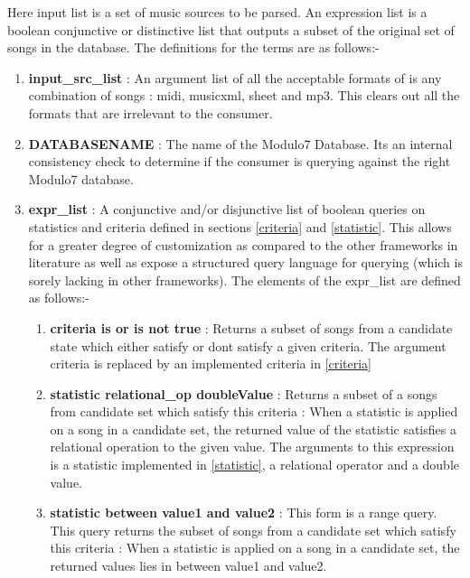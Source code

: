 \noindent Here input list is a set of music sources to be parsed. An expression list is a boolean conjunctive or distinctive list that outputs a subset of the original set of songs in the database. The definitions for the terms are as follows:-

\begin{enumerate}
\item \textbf{input\_src\_list} : An argument list of all the acceptable formats of is any combination of songs : midi, musicxml, sheet and mp3. This clears out all the formats that are irrelevant to the consumer. 

\item \textbf{DATABASENAME} : The name of the Modulo7 Database. Its an internal consistency check to determine if the consumer is querying against the right Modulo7 database. 

\item \textbf{expr\_list} : A conjunctive and/or disjunctive list of boolean queries on statistics and criteria defined in sections \ref{criteria} and \ref{statistic}. This allows for a greater degree of customization as compared to the other frameworks in literature as well as expose a structured query language for querying (which is sorely lacking in other frameworks). The elements of the expr\_list are defined as follows:-

\begin{enumerate}
\item \textbf{criteria is or is not true} : Returns a subset of songs from a candidate state which either satisfy or dont satisfy a given criteria. The argument criteria is replaced by an implemented criteria in \ref{criteria}
\item \textbf{statistic relational\_op doubleValue} : Returns a subset of a songs from candidate set which satisfy this criteria : When a statistic is applied on a song in a candidate set, the returned value of the statistic satisfies a relational operation to the given value. The arguments to this expression is a statistic implemented in \ref{statistic}, a relational operator and a double value.
\item \textbf{statistic between value1 and value2} : This form is a range query. This query returns the subset of songs from a candidate set which satisfy this criteria : When a statistic is applied on a song in a candidate set, the returned values lies in between value1 and value2. 
\end{enumerate}
\end{enumerate}

